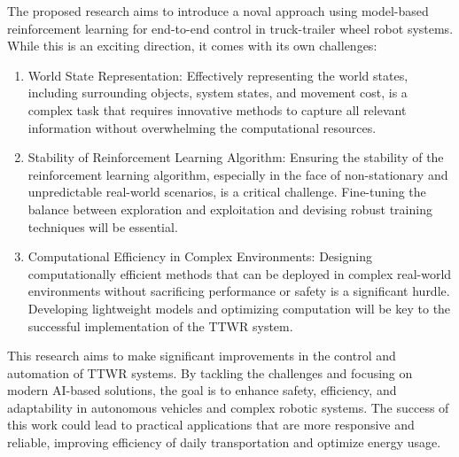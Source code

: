 The proposed research aims to introduce a noval approach using model-based reinforcement learning for end-to-end control in truck-trailer wheel robot systems. While this is an exciting direction, it comes with its own challenges:

\begin{enumerate}
   \item World State Representation: Effectively representing the world states, including surrounding objects, system states, and movement cost, is a complex task that requires innovative methods to capture all relevant information without overwhelming the computational resources.
   \item Stability of Reinforcement Learning Algorithm: Ensuring the stability of the reinforcement learning algorithm, especially in the face of non-stationary and unpredictable real-world scenarios, is a critical challenge. Fine-tuning the balance between exploration and exploitation and devising robust training techniques will be essential.
   \item Computational Efficiency in Complex Environments: Designing computationally efficient methods that can be deployed in complex real-world environments without sacrificing performance or safety is a significant hurdle. Developing lightweight models and optimizing computation will be key to the successful implementation of the TTWR system.
\end{enumerate}

This research aims to make significant improvements in the control and automation of TTWR systems. By tackling the challenges and focusing on modern AI-based solutions, the goal is to enhance safety, efficiency, and adaptability in autonomous vehicles and complex robotic systems. The success of this work could lead to practical applications that are more responsive and reliable, improving efficiency of daily transportation and optimize energy usage.